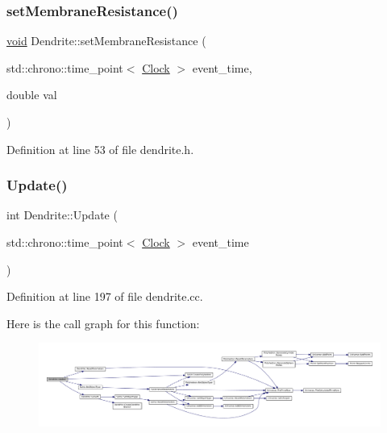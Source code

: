 \subsubsection{\texorpdfstring{set\+Membrane\+Resistance()}{setMembraneResistance()}}
{\footnotesize\ttfamily \mbox{\hyperlink{glad_8h_a950fc91edb4504f62f1c577bf4727c29}{void}} Dendrite\+::set\+Membrane\+Resistance (\begin{DoxyParamCaption}\item[{std\+::chrono\+::time\+\_\+point$<$ \mbox{\hyperlink{universe_8h_a0ef8d951d1ca5ab3cfaf7ab4c7a6fd80}{Clock}} $>$}]{event\+\_\+time,  }\item[{double}]{val }\end{DoxyParamCaption})\hspace{0.3cm}{\ttfamily [inline]}}



Definition at line 53 of file dendrite.\+h.

\mbox{\label{class_dendrite_a2e7bfde37bc7aec2547253ad038aaa04}} 
\subsubsection{\texorpdfstring{Update()}{Update()}}
{\footnotesize\ttfamily int Dendrite\+::\+Update (\begin{DoxyParamCaption}\item[{std\+::chrono\+::time\+\_\+point$<$ \mbox{\hyperlink{universe_8h_a0ef8d951d1ca5ab3cfaf7ab4c7a6fd80}{Clock}} $>$}]{event\+\_\+time }\end{DoxyParamCaption})}



Definition at line 197 of file dendrite.\+cc.

Here is the call graph for this function\+:\nopagebreak
\begin{figure}[H]
\begin{center}
\leavevmode
\includegraphics[width=350pt]{class_dendrite_a2e7bfde37bc7aec2547253ad038aaa04_cgraph}
\end{center}
\end{figure}


